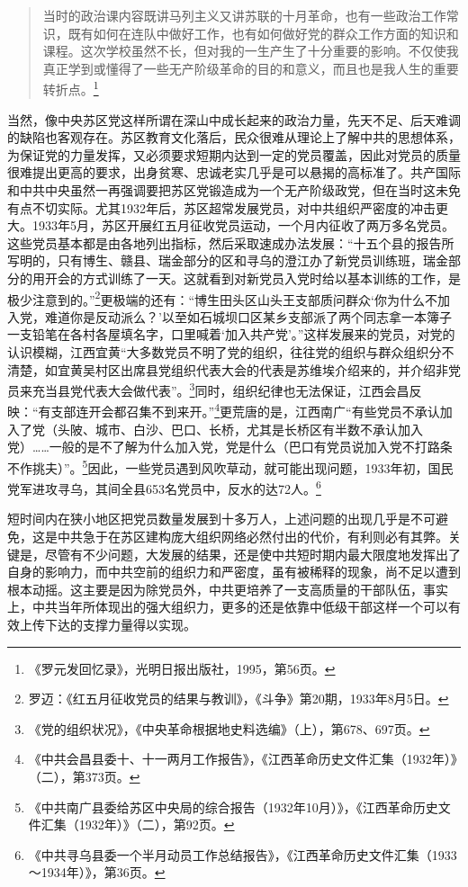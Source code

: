 \begin{quote}

当时的政治课内容既讲马列主义又讲苏联的十月革命，也有一些政治工作常识，既有如何在连队中做好工作，也有如何做好党的群众工作方面的知识和课程。这次学校虽然不长，但对我的一生产生了十分重要的影响。不仅使我真正学到或懂得了一些无产阶级革命的目的和意义，而且也是我人生的重要转折点。\footnote{《罗元发回忆录》，光明日报出版社，1995，第56页。}
\end{quote}


当然，像中央苏区党这样所谓在深山中成长起来的政治力量，先天不足、后天难调的缺陷也客观存在。苏区教育文化落后，民众很难从理论上了解中共的思想体系，为保证党的力量发挥，又必须要求短期内达到一定的党员覆盖，因此对党员的质量很难提出更高的要求，出身贫寒、忠诚老实几乎是可以悬揭的高标准了。共产国际和中共中央虽然一再强调要把苏区党锻造成为一个无产阶级政党，但在当时这未免有点不切实际。尤其1932年后，苏区超常发展党员，对中共组织严密度的冲击更大。1933年5月，苏区开展红五月征收党员运动，一个月内征收了两万多名党员。这些党员基本都是由各地列出指标，然后采取速成办法发展：“十五个县的报告所写明的，只有博生、赣县、瑞金部分的区和寻乌的澄江办了新党员训练班，瑞金部分的用开会的方式训练了一天。这就看到对新党员入党时给以基本训练的工作，是极少注意到的。”\footnote{罗迈：《红五月征收党员的结果与教训》，《斗争》第20期，1933年8月5日。}更极端的还有：“博生田头区山头王支部质问群众‘你为什么不加入党，难道你是反动派么？’以至如石城坝口区某乡支部派了两个同志拿一本簿子一支铅笔在各村各屋填名字，口里喊着‘加入共产党’。”这样发展来的党员，对党的认识模糊，江西宜黄“大多数党员不明了党的组织，往往党的组织与群众组织分不清楚，如宜黄吴村区出席县党组织代表大会的代表是苏维埃介绍来的，并介绍非党员来充当县党代表大会做代表”。\footnote{《党的组织状况》，《中央革命根据地史料选编》（上），第678、697页。}同时，组织纪律也无法保证，江西会昌反映：“有支部连开会都召集不到来开。”\footnote{《中共会昌县委十、十一两月工作报告》，《江西革命历史文件汇集（1932年）》（二），第373页。}更荒唐的是，江西南广“有些党员不承认加入了党（头陂、城市、白沙、巴口、长桥，尤其是长桥区有半数不承认加入党）……一般的是不了解为什么加入党，党是什么（巴口有党员说加入党不打路条不作挑夫）”。\footnote{《中共南广县委给苏区中央局的综合报告（1932年10月）》，《江西革命历史文件汇集（1932年）》（二），第92页。}因此，一些党员遇到风吹草动，就可能出现问题，1933年初，国民党军进攻寻乌，其间全县653名党员中，反水的达72人。\footnote{《中共寻乌县委一个半月动员工作总结报告》，《江西革命历史文件汇集（1933～1934年）》，第36页。}


短时间内在狭小地区把党员数量发展到十多万人，上述问题的出现几乎是不可避免，这是中共急于在苏区建构庞大组织网络必然付出的代价，有利则必有其弊。关键是，尽管有不少问题，大发展的结果，还是使中共短时期内最大限度地发挥出了自身的影响力，而中共空前的组织力和严密度，虽有被稀释的现象，尚不足以遭到根本动摇。这主要是因为除党员外，中共更培养了一支高质量的干部队伍，事实上，中共当年所体现出的强大组织力，更多的还是依靠中低级干部这样一个可以有效上传下达的支撑力量得以实现。


